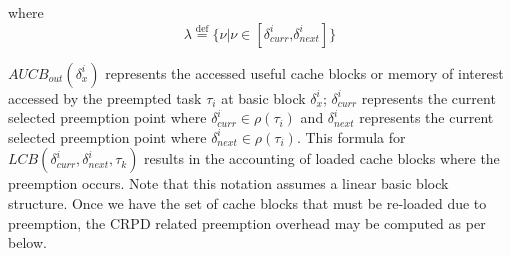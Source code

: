 \noindent
where
\begin{equation*}\label{eqn:lcb-formula-1b}
    \lambda \stackrel{\text{def}}{=} \{ \nu|\nu \in [ \delta_{curr}^{i} \text{,} \delta_{next}^{i} ] \}
\end{equation*}

\noindent
\begin{math}\textit{AUCB}_{out}(\delta_{x}^{i})\end{math} represents the accessed useful cache blocks or memory of interest accessed by the preempted task \begin{math}\tau_{i}\end{math} at basic block \begin{math}\delta_{x}^{i}\end{math}; \begin{math}\delta_{curr}^{i}\end{math} represents the current selected preemption point where \begin{math}\delta_{curr}^{i} \in \rho(\tau_{i})\end{math} and \begin{math}\delta_{next}^{i}\end{math} represents the current selected preemption point where \begin{math}\delta_{next}^{i} \in \rho(\tau_{i})\end{math}.  This formula for \begin{math}\textit{LCB}(\delta_{curr}^{i},\delta_{next}^{i},\tau_{k})\end{math} results in the accounting of loaded cache blocks where the preemption occurs.  Note that this notation assumes a linear basic block structure. Once we have the set of cache blocks that must be re-loaded due to preemption, the CRPD related preemption overhead may be computed as per below.
